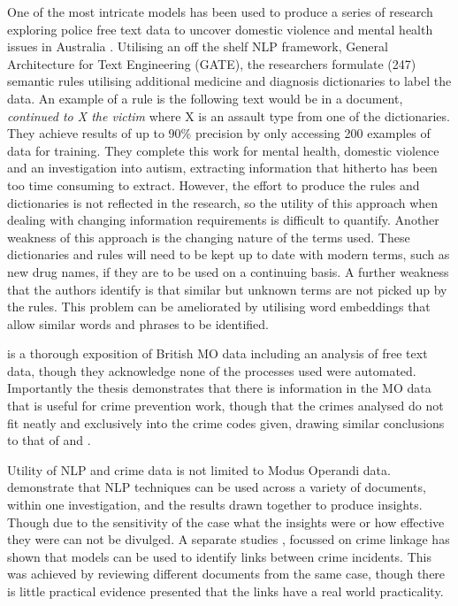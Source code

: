 One of the most intricate models has been used to produce a series of research exploring police free text data to uncover domestic violence and mental health issues in Australia  \parencite{karystianis2018automatic, karystianis2019automated, Hwang2020}. Utilising an off the shelf NLP framework, General Architecture for Text Engineering (GATE), the researchers formulate (247) semantic rules utilising additional medicine and diagnosis dictionaries  to label the data. An example of a rule is the following text would be in a document,  \emph{continued to X the victim} where X is an assault type from one of the dictionaries. They achieve results of up to 90\% precision by only accessing 200 examples of data for training. They complete this work for mental health, domestic violence and an investigation into autism, extracting information that hitherto has been too time consuming to extract. However, the effort to produce the rules and dictionaries is not reflected in the research, so the utility of this approach when dealing with changing information requirements is difficult to quantify. Another weakness of this approach is the changing nature of the terms used. These dictionaries and rules will need to be kept up to date with modern terms, such as new drug names, if they are to be used on a continuing basis. A further weakness that the authors identify is that similar but unknown terms are not picked up by the rules. This problem can be ameliorated by utilising word embeddings that allow similar words and phrases to be identified.

\textcite{rogerson2016utility} is a thorough exposition of British MO data including an analysis of free text data, though they acknowledge none of the processes used were automated. Importantly the thesis demonstrates that there is information in the MO data that is useful for crime prevention work, though that the crimes analysed do not fit neatly and exclusively into the crime codes given, drawing similar conclusions to that of \textcite{birks2020unsupervised} and \textcite{kuang2017crime}. 

 
Utility of NLP and crime data is not limited to Modus Operandi data. \textcite{Helbich2013326} demonstrate that NLP techniques can be used across a variety of documents, within one investigation, and the results drawn together to produce  insights. Though due to the sensitivity of the case what the insights were or how effective they were can not be divulged. A separate studies  \textcite{cocx2006distance}, focussed on crime linkage has shown that models can be used to identify links between crime incidents. This was achieved by reviewing different documents from the same case, though there is little practical evidence presented that the links have a real world practicality. 

